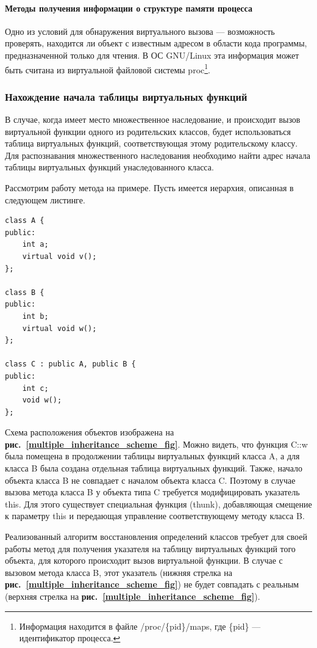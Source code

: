 \documentclass[a4paper,12pt,russian]{article}
\newcommand{\picref}[1]{\textbf{рис.~\ref{#1}}}
\newcommand{\code}[1]{\textsf{#1}}
\begin{document}
\paragraph{Методы получения информации о структуре памяти процесса}
Одно из условий для обнаружения виртуального вызова --- возможность проверять, находится ли объект с известным адресом в области кода программы, предназначенной только для чтения.
В ОС GNU/Linux эта информация может быть считана из виртуальной файловой системы \code{proc}\footnote{Информация находится в файле \code{/proc/\{pid\}/maps}, где \code{\{pid\}} --- идентификатор процесса.}.

\subsubsection{Нахождение начала таблицы виртуальных функций}
\label{vtable_beginning_search}
В случае, когда имеет место множественное наследование, и происходит вызов виртуальной функции одного из родительских классов, будет использоваться таблица виртуальных функций, соответствующая этому родительскому классу.
Для распознавания множественного наследования необходимо найти адрес начала таблицы виртуальных функций унаследованного класса.

Рассмотрим работу метода на примере. Пусть имеется иерархия, описанная в следующем листинге.
\begin{lstlisting}
class A {
public:
    int a;
    virtual void v();
};

class B {
public:
    int b;
    virtual void w();
};

class C : public A, public B {
public:
    int c;
    void w();
};
\end{lstlisting}
Схема расположения объектов изображена на \picref{multiple_inheritance_scheme_fig}.
Можно видеть, что функция \code{C::w} была помещена в продолжении таблицы виртуальных функций класса \code{A}, а для класса \code{B} была создана отдельная таблица виртуальных функций.
Также, начало объекта класса \code{B} не совпадает с началом объекта класса \code{C}.
Поэтому в случае вызова метода класса \code{B} у объекта типа \code{C} требуется модифицировать указатель \code{this}.
Для этого существует специальная функция (\code{thunk}), добавляющая смещение к параметру \code{this} и передающая управление соответствующему методу класса \code{B}.

Реализованный алгоритм восстановления определений классов требует для своей работы метод для получения указателя на таблицу виртуальных функций того объекта, для которого происходит вызов виртуальной функции.
В случае с вызовом метода класса \code{B}, этот указатель (нижняя стрелка на \picref{multiple_inheritance_scheme_fig}) не будет совпадать с реальным (верхняя стрелка на \picref{multiple_inheritance_scheme_fig}).
\end{document}
